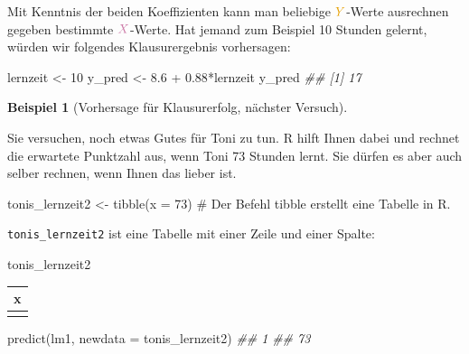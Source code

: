 \documentclass[
  a4paper,
]{scrbook}
\newenvironment{Shaded}{\begin{snugshade}}{\end{snugshade}}
\newcommand{\AttributeTok}[1]{\textcolor[rgb]{0.40,0.45,0.13}{#1}}
\newcommand{\CommentTok}[1]{\textcolor[rgb]{0.37,0.37,0.37}{#1}}
\newcommand{\DecValTok}[1]{\textcolor[rgb]{0.68,0.00,0.00}{#1}}
\newcommand{\DocumentationTok}[1]{\textcolor[rgb]{0.37,0.37,0.37}{\textit{#1}}}
\newcommand{\FloatTok}[1]{\textcolor[rgb]{0.68,0.00,0.00}{#1}}
\newcommand{\FunctionTok}[1]{\textcolor[rgb]{0.28,0.35,0.67}{#1}}
\newcommand{\NormalTok}[1]{\textcolor[rgb]{0.00,0.23,0.31}{#1}}
\newcommand{\OtherTok}[1]{\textcolor[rgb]{0.00,0.23,0.31}{#1}}
\newcommand{\SpecialCharTok}[1]{\textcolor[rgb]{0.37,0.37,0.37}{#1}}
\theoremstyle{definition}
\newtheorem{example}{Beispiel}[chapter]
\theoremstyle{definition}
\theoremstyle{definition}
\theoremstyle{remark}
\begin{document}
Mit Kenntnis der beiden Koeffizienten kann man beliebige
\(\color{ycol}{Y}\)-Werte ausrechnen gegeben bestimmte
\(\color{xcol}{X}\)-Werte. Hat jemand zum Beispiel 10 Stunden gelernt,
würden wir folgendes Klausurergebnis vorhersagen:

\begin{Shaded}
\begin{Highlighting}[]
\NormalTok{lernzeit }\OtherTok{\textless{}{-}} \DecValTok{10}
\NormalTok{y\_pred }\OtherTok{\textless{}{-}} \FloatTok{8.6} \SpecialCharTok{+} \FloatTok{0.88}\SpecialCharTok{*}\NormalTok{lernzeit}
\NormalTok{y\_pred}
\DocumentationTok{\#\# [1] 17}
\end{Highlighting}
\end{Shaded}

\begin{example}[Vorhersage für Klausurerfolg, nächster
Versuch]\protect\hypertarget{exm-noten6}{}\label{exm-noten6}

Sie versuchen, noch etwas Gutes für Toni zu tun. R hilft Ihnen dabei und
rechnet die erwartete Punktzahl aus, wenn Toni 73 Stunden lernt. Sie
dürfen es aber auch selber rechnen, wenn Ihnen das lieber ist.

\end{example}

\begin{Shaded}
\begin{Highlighting}[]
\NormalTok{tonis\_lernzeit2 }\OtherTok{\textless{}{-}} \FunctionTok{tibble}\NormalTok{(}\AttributeTok{x =} \DecValTok{73}\NormalTok{)  }\CommentTok{\# Der Befehl \textasciigrave{}tibble\textasciigrave{} erstellt eine Tabelle in R.}
\end{Highlighting}
\end{Shaded}

\texttt{tonis\_lernzeit2} ist eine Tabelle mit einer Zeile und einer
Spalte:

\begin{Shaded}
\begin{Highlighting}[]
\NormalTok{tonis\_lernzeit2}
\end{Highlighting}
\end{Shaded}

\begin{longtable}[]{@{}r@{}}
\toprule\noalign{}
x \\
\midrule\noalign{}
\endhead
\bottomrule\noalign{}
\endlastfoot
73 \\
\end{longtable}

\begin{Shaded}
\begin{Highlighting}[]
\FunctionTok{predict}\NormalTok{(lm1, }\AttributeTok{newdata =}\NormalTok{ tonis\_lernzeit2)}
\DocumentationTok{\#\#  1 }
\DocumentationTok{\#\# 73}
\end{Highlighting}
\end{Shaded}
\end{document}
